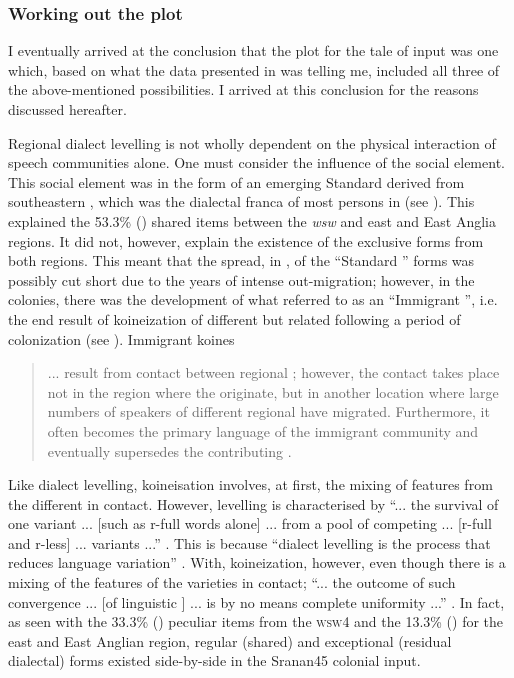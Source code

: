 \subsubsection{Working out the plot}\label{7.2.1.1}
I eventually arrived at the conclusion that the plot for the tale of input was one which, based on what the data presented in  was telling me, included all three of the above-mentioned possibilities. I arrived at this conclusion for the reasons discussed hereafter.

Regional dialect levelling is not wholly dependent on the physical interaction of speech communities alone. One must consider the influence of the social element. This social element was in the form of an emerging Standard  derived from southeastern , which was the dialectal  franca of most persons in  (see \citealt{Smith87, Smith08}). This explained the 53.3\% () shared items between the \emph{wsw} and east and East Anglia regions. It did not, however, explain the existence of the exclusive forms from both regions. This meant that the spread, in , of the ``Standard '' forms was possibly cut short due to the years of intense out-migration; however, in the colonies, there was the development of what \citet{Siegel85} referred to as an ``Immigrant '', i.e. the end result of koineization of different but related  following a period of colonization (see \citealt{Siegel04}). Immigrant koines

\begin{quote}
... result from contact between regional ; however, the contact takes place not in the region where the  originate, but in another location where large numbers of speakers of different regional  have migrated. Furthermore, it often becomes the primary language of the immigrant community and eventually supersedes the contributing  \citep{Siegel85}.
\end{quote}

Like dialect levelling, koineisation involves, at first, the mixing of features from the different  in contact. However, levelling is characterised by ``... the survival of one variant ... [such as r-full words alone] ... from a pool of competing ... [r-full and r-less] ... variants ...'' \citep[91]{Tuten03}. This is because ``dialect levelling is the process that reduces language variation'' \citep[313]{Hinskens09}. With, koineization, however, even though there is a mixing of the features of the varieties in contact; ``... the outcome of such convergence ... [of linguistic ] ... is by no means complete uniformity ...'' \citep[193]{Bynon83}. In fact, as seen with the 33.3\% () peculiar items from the \textsc{wsw4} and the 13.3\% () for the east and East Anglian region, regular (shared) and exceptional (residual dialectal) forms existed side-by-side in the Sranan45 colonial  input.

